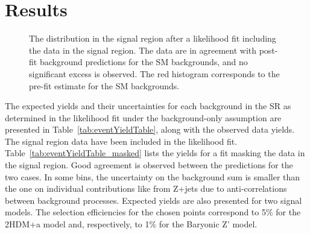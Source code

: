 \section{Results}


\begin{figure}
\centering
\caption{The \MET distribution in the signal region after a likelihood fit including the data in the signal region. The data are in agreement with post-fit background predictions for the SM backgrounds, and no significant excess is observed. The red histogram corresponds to the pre-fit estimate for the SM backgrounds.}
\label{Fig_sr}
\end{figure}


The expected yields and their uncertainties for each background in the SR as determined in the likelihood fit under the background-only assumption are presented in Table~\ref{tab:eventYieldTable}, along with the observed data yields. The signal region data have been included in the likelihood fit.  Table~\ref{tab:eventYieldTable_masked} lists the yields for a fit masking the data in the signal region. Good agreement is observed between the predictions for the two cases. In some bins, the uncertainty on the background sum is smaller than the one on individual contributions like from Z+jets due to anti-correlations between background processes. Expected yields are also presented for two signal models. The selection efficiencies for the chosen points correspond to 5\% for the 2HDM+a model and, respectively, to 1\% for the Baryonic Z' model. %

